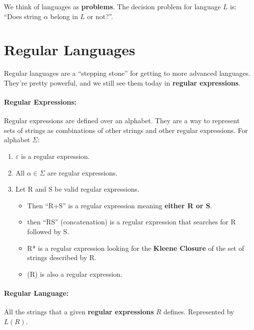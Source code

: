 \documentclass[a4paper,12pt]{report}
\begin{document}
We think of languages as \textbf{problems}. The decision problem for language $L$ is: ``Does string $\alpha$ belong in $L$ or not?''.


\section{Regular Languages}

Regular languages are a ``stepping stone'' for getting to more advanced languages. They're pretty powerful, and we still see them today in \textbf{regular expressions}.

\paragraph{Regular Expressions: } Regular expressions are defined over an alphabet. They are a way to represent sets of strings as combinations of other strings and other regular expressions. For alphabet $\Sigma$:
\begin{enumerate}
\item $\varepsilon$ is a regular expression.
\item All $\alpha \in \Sigma$ are regular expressions.
\item Let R and S be valid regular expressions. 
\begin{itemize}
\item Then ``R+S'' is a regular expression meaning \textbf{either R or S}.
\item then ``RS'' (concatenation) is a regular expression that searches for R followed by S.
\item R* is a regular expression looking for the \textbf{Kleene Closure} of the set of strings described by R.
\item (R) is also a regular expression.
\end{itemize}
\end{enumerate}

\paragraph{Regular Language: } All the strings that a given \textbf{regular expressions} $R$ defines. Represented by $L(R)$.
\end{document}
